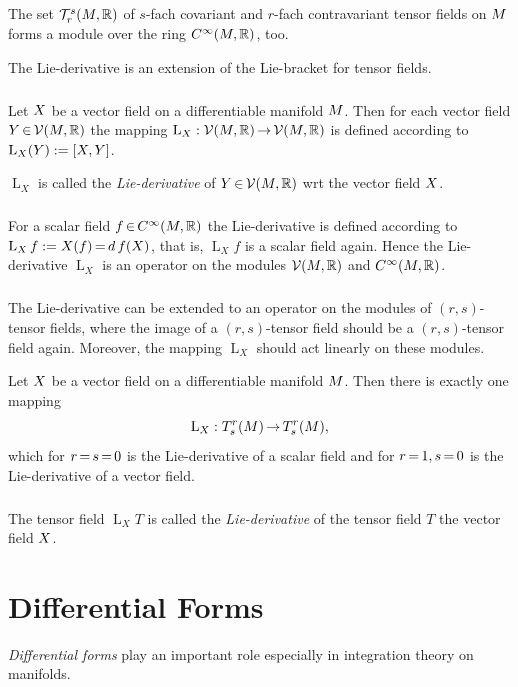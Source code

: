 \documentclass[11pt,twoside]{article}
\begin{document}
\subparagraph{}
The set ${\mathcal{T}}_r^s({M},{\mathbb{R}})$ of $s$-fach covariant and $r$-fach
contravariant tensor fields on ${M}$ forms a module
over the ring $C^{\infty}({M},{\mathbb{R}})$, too.

The Lie-derivative is an extension of the Lie-bracket for tensor fields.

\subparagraph{}
Let $X$ be a vector field on a differentiable manifold ${M}$.
Then for each vector field $Y {\,\in\,} {\mathcal{V}}({M},{\mathbb{R}})$ the mapping
$\operatorname{L}_X: {\mathcal{V}}({M},{\mathbb{R}}) {\,\to\,} {\mathcal{V}}({M},{\mathbb{R}})$
is defined according to $\operatorname{L}_X(Y) := [X,Y]$.

\begin{definition}
$\operatorname{L}_X$ is called the \textit{Lie-derivative} of
$Y {\,\in\,} {\mathcal{V}}({M},{\mathbb{R}})$ {wrt} the vector field $X$.
\end{definition}

\subparagraph{}
For a scalar field $f {\,\in\,} C^{\infty}({M},{\mathbb{R}})$ the Lie-derivative
is defined according to $\operatorname{L}_X f := X(f) {\,=\,} d \, f(X)$,
that is,
$\operatorname{L}_X f$ is a scalar field again.
Hence the Lie-derivative $\operatorname{L}_X$ is an operator
on the modules ${\mathcal{V}}({M},{\mathbb{R}})$ and $C^{\infty}({M},{\mathbb{R}})$.

\subparagraph{}
The Lie-derivative can be extended to an operator on the modules of
$(r,s)$-tensor fields,
where the image of a $(r,s)$-tensor field should be a $(r,s)$-tensor field
again.
Moreover,
the mapping $\operatorname{L}_X$ should act linearly on these modules.

\begin{theorem}
Let $X$ be a vector field on a differentiable manifold ${M}$.
Then there is exactly one mapping
\[
\operatorname{L}_X:T_s^r({M}) {\,\to\,} T_s^r({M}),
\]
which for $r {\,=\,} s {\,=\,} 0$ is the Lie-derivative of a scalar field and for
$r {\,=\,} 1, s {\,=\,} 0$ is the Lie-derivative of a vector field.
\end{theorem}

\subparagraph{}
The tensor field $\operatorname{L}_X T$ is called the \textit{Lie-derivative}
of the tensor field $T$ {\wrt} the vector field $X$.

\section{Differential Forms}
\textit{Differential forms} play an important role
especially in integration theory on manifolds.
\end{document}
